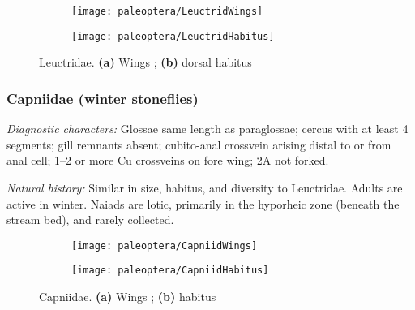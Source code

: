 \begin{figure}[ht!]
    \centering
    \begin{subfigure}[ht!]{0.4\textwidth}
        \texttt{[image: paleoptera/LeuctridWings]}
        \caption{}
        \label{fig:leuctrid1}
    \end{subfigure}
    \qquad
    \begin{subfigure}[ht!]{0.5\textwidth}
        \texttt{[image: paleoptera/LeuctridHabitus]}
        \caption{}
        \label{fig:leuctrid2}
    \end{subfigure}
    \caption{Leuctridae. \textbf{(a)} Wings \citep[redrawn from][Plate 32, Fig. 1]{bhl29875}; \textbf{(b)} dorsal habitus \citep[modified from][Fig. 26]{bhl29875}}\label{fig:leuctrids}
\end{figure}

\subsubsection{Capniidae (winter stoneflies)}
\noindent{}\textit{Diagnostic characters:} Glossae same length as paraglossae; cercus with at least 4 segments; gill remnants absent; cubito-anal crossvein arising distal to or from anal cell; 1--2 or more Cu crossveins on fore wing; 2A not forked.\vspace{3mm}

\noindent{}\textit{Natural history:} Similar in size, habitus, and diversity to Leuctridae. Adults are active in winter. Naiads are lotic, primarily in the hyporheic zone (beneath the stream bed), and rarely collected.\vspace{3mm}

\begin{figure}[ht!]
    \centering
    \begin{subfigure}[ht!]{0.4\textwidth}
        \texttt{[image: paleoptera/CapniidWings]}
        \caption{}
        \label{fig:capniid1}
    \end{subfigure}
    \qquad
    \begin{subfigure}[ht!]{0.52\textwidth}
        \texttt{[image: paleoptera/CapniidHabitus]}
        \caption{}
        \label{fig:capniid2}
    \end{subfigure}
    \caption{Capniidae. \textbf{(a)} Wings \citep[modified from][Plate 47, Fig. 2]{bhl29875}; \textbf{(b)} habitus \citep[redrawn from][Fig. 28]{bhl29875}}\label{fig:capniids}
\end{figure}

